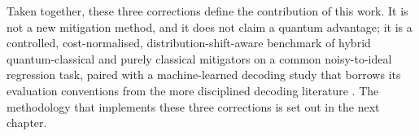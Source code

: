 \documentclass[Thesis.tex]{subfiles}
\begin{document}
Taken together, these three corrections define the contribution of this work.
It is not a new mitigation method, and it does not claim a quantum advantage;
it is a controlled, cost-normalised, distribution-shift-aware benchmark of
hybrid quantum-classical and purely classical mitigators on a common
noisy-to-ideal regression task, paired with a machine-learned decoding
study that borrows its evaluation conventions from the more disciplined
decoding literature
\cite{varbanov2025neural,lange2025data,bausch2024learning}. The methodology
that implements these three corrections is set out in the next chapter.
\end{document}
